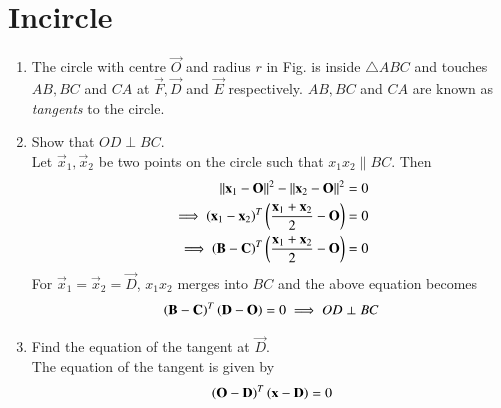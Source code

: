 \documentclass[journal,12pt,twocolumn]{IEEEtran}
\renewcommand\thesection{\arabic{section}}
\begin{document}
\section{Incircle}
\begin{enumerate}[label=\thesection.\arabic*
,ref=\thesection.\theenumi]
\item The circle with centre $\vec{O}$ and radius $r$ in Fig. is inside 
$\triangle ABC$ and touches $AB, BC$ 
and $CA$ at $\vec{F}, \vec{D}$ and $\vec{E}$ respectively. $AB, BC$ and 
$CA$ are known as {\em tangents} to the circle.
\item Show that $OD \perp BC$.
\\
\solution Let $\vec{x}_1,\vec{x}_2$ be two points on the circle such that 
$x_1x_2 \parallel BC$. Then
%
\begin{align}
\lVert\mathbf{x}_1-\mathbf{O}\rVert^2- 
\lVert\mathbf{x}_2-\mathbf{O}\rVert^2 &= 0 
\\
\implies 
\left(\mathbf{x}_1-\mathbf{x}_2\right)^T\left(\frac{\mathbf{x}_1+\mathbf{x}_2}{2}-\mathbf{O}\right) &= 
0 
\\
\implies 
\left(\mathbf{B}-\mathbf{C}\right)^T\left(\frac{\mathbf{x}_1+\mathbf{x}_2}{2}-\mathbf{O}\right) &= 
0 
\end{align}
%
For $\vec{x}_1=\vec{x}_2=\vec{D}$, $x_1x_2$ merges into $BC$ and the above 
equation becomes 
%
\begin{align}
\left(\mathbf{B}-\mathbf{C}\right)^T\left(\mathbf{D}-\mathbf{O}\right) = 
0 
\implies OD \perp BC
\end{align}
%
\item Find the equation of the tangent at $\vec{D}$.
\\
\solution The equation of the tangent is given by 
\begin{align}
\left(\mathbf{O}-\mathbf{D}\right)^T\left(\mathbf{x}-\mathbf{D}\right)=0
\end{align}

\end{enumerate}
\end{document}
